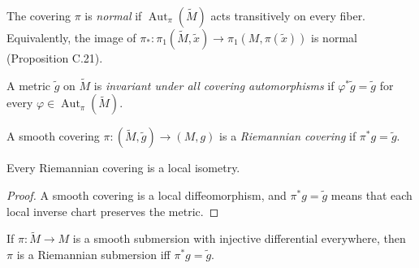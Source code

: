 \begin{definition}
\label{def:normal-covering-fibre-transitive}
\leanok
{}
The covering $\pi$ is \emph{normal} if $\operatorname{Aut}_\pi(\tilde M)$ acts transitively on every fiber. Equivalently, the image of $\pi_*:\pi_1(\tilde M,\tilde x)\to\pi_1(M,\pi(\tilde x))$ is normal (Proposition C.21).
\end{definition}

\begin{definition}
\label{def:covering-automorphism-invariant-metric}
\leanok
{}
A metric $\tilde g$ on $\tilde M$ is \emph{invariant under all covering automorphisms} if $\varphi^*\tilde g=\tilde g$ for every $\varphi\in\operatorname{Aut}_\pi(\tilde M)$.
\end{definition}

\begin{definition}
\label{def:riemannian-covering}
\leanok
{}
A smooth covering $\pi:(\tilde M,\tilde g)\to(M,g)$ is a \emph{Riemannian covering} if $\pi^*g=\tilde g$.
\end{definition}

\begin{lemma}
\label{lem:riemannian-covering-local-isometry}
\leanok
{}
Every Riemannian covering is a local isometry.
\end{lemma}

\begin{proof}
\leanok
{}
\sketch A smooth covering is a local diffeomorphism, and $\pi^*g=\tilde g$ means that each local inverse chart preserves the metric.
\end{proof}

\begin{proposition}
\label{prop:equidimensional-riemannian-submersion-local-isometry}
\leanok
{}
If $\pi:\tilde M\to M$ is a smooth submersion with injective differential everywhere, then $\pi$ is a Riemannian submersion iff $\pi^*g=\tilde g$.
\end{proposition}

